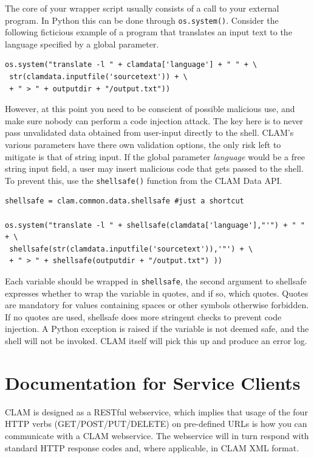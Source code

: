 \documentclass[a4paper,12pt]{report}
\begin{document}
The core of your wrapper script usually consists of a call to your external
program. In Python this can be done through \texttt{os.system()}. Consider the
following ficticious example of a program that translates an input text to the
language specified by a global parameter.

\begin{verbatim}
os.system("translate -l " + clamdata['language'] + " " + \
 str(clamdata.inputfile('sourcetext')) + \
 + " > " + outputdir + "/output.txt"))
\end{verbatim}


However, at this point
you need to be conscient of possible malicious use, and make sure nobody can
perform a code injection attack. The key here is to never pass unvalidated data
obtained from user-input directly to the shell. CLAM's various parameters have
there own validation options, the only risk left to mitigate is that of string
input. If the global parameter \emph{language} would be a free string input
field, a user may insert malicious code that gets passed to the shell. To
prevent this, use the \texttt{shellsafe()} function from the CLAM Data API. 


\begin{verbatim}
shellsafe = clam.common.data.shellsafe #just a shortcut

os.system("translate -l " + shellsafe(clamdata['language'],"'") + " " + \
 shellsafe(str(clamdata.inputfile('sourcetext')),'"') + \
 + " > " + shellsafe(outputdir + "/output.txt") ))
\end{verbatim}

Each variable should be wrapped in \texttt{shellsafe}, the second argument to
shellsafe expresses whether to wrap the variable in quotes, and if so, which
quotes. Quotes are mandatory for values containing spaces or other symbols
otherwise forbidden. If no quotes are used, shellsafe does more stringent
checks to prevent code injection. A Python exception is raised if the variable
is not deemed safe, and the shell will not be invoked. CLAM itself will pick
this up and produce an error log.


\chapter{Documentation for Service Clients}

CLAM is designed as a RESTful webservice, which implies that usage of the four
HTTP verbs (GET/POST/PUT/DELETE) on pre-defined URLs is how you can communicate
with a CLAM webservice. The webservice will in turn respond with standard HTTP
response codes and, where applicable, in CLAM XML format.
\end{document}
